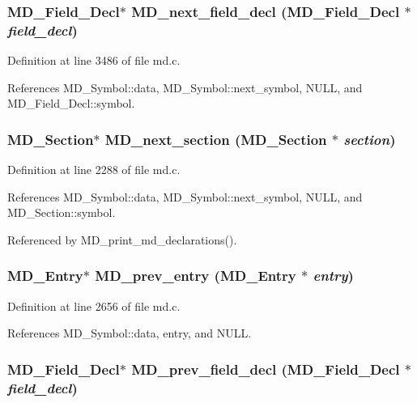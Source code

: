 \subsubsection{\setlength{\rightskip}{0pt plus 5cm}\bf{MD\_\-Field\_\-Decl}$\ast$ MD\_\-next\_\-field\_\-decl (\bf{MD\_\-Field\_\-Decl} $\ast$ {\em field\_\-decl})}\label{md_8h_a1591f954c0b8b00c6a22356c02024ff}




Definition at line 3486 of file md.c.

References MD\_\-Symbol::data, MD\_\-Symbol::next\_\-symbol, NULL, and MD\_\-Field\_\-Decl::symbol.
\subsubsection{\setlength{\rightskip}{0pt plus 5cm}\bf{MD\_\-Section}$\ast$ MD\_\-next\_\-section (\bf{MD\_\-Section} $\ast$ {\em section})}\label{md_8h_e663f86a14d893405f3f150ba80ba952}




Definition at line 2288 of file md.c.

References MD\_\-Symbol::data, MD\_\-Symbol::next\_\-symbol, NULL, and MD\_\-Section::symbol.

Referenced by MD\_\-print\_\-md\_\-declarations().
\subsubsection{\setlength{\rightskip}{0pt plus 5cm}\bf{MD\_\-Entry}$\ast$ MD\_\-prev\_\-entry (\bf{MD\_\-Entry} $\ast$ {\em entry})}\label{md_8h_17c27e55e9e4df9522f5c06ba887c978}




Definition at line 2656 of file md.c.

References MD\_\-Symbol::data, entry, and NULL.
\subsubsection{\setlength{\rightskip}{0pt plus 5cm}\bf{MD\_\-Field\_\-Decl}$\ast$ MD\_\-prev\_\-field\_\-decl (\bf{MD\_\-Field\_\-Decl} $\ast$ {\em field\_\-decl})}\label{md_8h_b410b1bc9335083a48061a2eb1b92eab}




